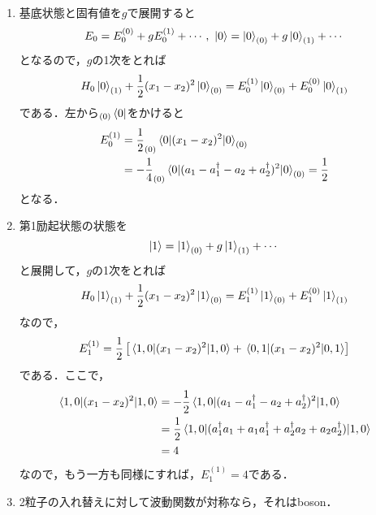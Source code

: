\documentclass[a4paper,pdflatex,ja=standard]{bxjsarticle}
\begin{document}
\begin{enumerate}
  \item 
  基底状態と固有値を$g$で展開すると
  \begin{equation}
    E_{0}
    =
    E_{0}^{(0)}
    +
    gE_{0}^{(1)}
    +\cdots
    ,\ 
    \ket{0}
    =
    \ket{0}_{(0)}
    +
    g
    \ket{0}_{(1)}
    +\cdots
  \end{equation}
  となるので，$g$の1次をとれば
  \begin{equation}
    H_{0}\ket{0}_{(1)}
    +
    \frac{1}{2}(x_{1}-x_{2})^2\ket{0}_{(0)}
    =
    E_{0}^{(1)}\ket{0}_{(0)}
    +
    E_{0}^{(0)}\ket{0}_{(1)}
  \end{equation}
  である．左から$_{(0)}\bra{0}$をかけると
  \begin{align}
    E_{0}^{(1)}
    &=
    \frac{1}{2}_{(0)}\ev*{0|(x_{1}-x_{2})^2|0}_{(0)}
    \nonumber
    \\
    &=
    -\frac{1}{4}_{(0)}\ev*{0|(a_1-a_1^{\dagger}-a_2+a_2^{\dagger})^2|0}_{(0)}
    =
    \frac{1}{2}
  \end{align}
  となる．

  \item 
  第1励起状態の状態を
  \begin{equation}
    \ket{1}
    =
    \ket{1}_{(0)}
    +
    g\ket{1}_{(1)}
    +
    \cdots
  \end{equation}
  と展開して，$g$の1次をとれば
  \begin{equation}
    H_{0}\ket{1}_{(1)}
    +
    \frac{1}{2}(x_{1}-x_{2})^2\ket{1}_{(0)}
    =
    E_{1}^{(1)}\ket{1}_{(0)}
    +
    E_{1}^{(0)}\ket{1}_{(1)}
  \end{equation}
  なので，
  \begin{equation}
    E_{1}^{(1)}
    =
    \frac{1}{2}
    \left[  
      \ev*{1,0|(x_1 - x_2)^2|1,0}
      +
      \ev*{0,1|(x_1 - x_2)^2|0,1}
    \right]
  \end{equation}
  である．ここで，
  \begin{align}
    \ev*{1,0|(x_1 - x_2)^2|1,0}
    &=
    -\frac{1}{2}
    \ev*{1,0|(
      a_1 - a_1^{\dagger}
      -
      a_2 + a_2^{\dagger}
    )^2|1,0}
    \nonumber
    \\
    &=
    \frac{1}{2}
    \ev*{1,0|(
      a_1^{\dagger} a_1
      +
      a_1 a_1^{\dagger}
      +
      a_2^{\dagger} a_2
      +
      a_2 a_2^{\dagger}
    )|1,0}
    \nonumber
    \\
    &=
    4
  \end{align}
  なので，もう一方も同様にすれば，$E_1^{(1)}=4$である．

  \item 
  2粒子の入れ替えに対して波動関数が対称なら，それはboson．


\end{enumerate}
\end{document}
